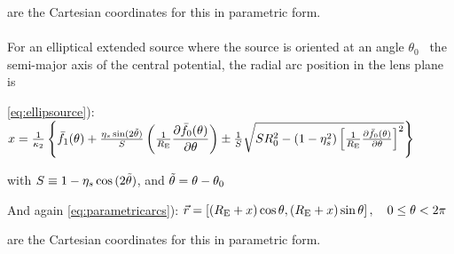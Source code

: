 are the Cartesian coordinates for this in parametric form.
\\
\\
For an elliptical extended source where the source is oriented at an angle $\theta_0$ \wrt\ the semi-major axis of the central potential, the radial arc position in the lens plane is

\eqref{eq:ellipsource}): $x = \frac{1}{\kappa_2} \left\{\bar{f}_{1}(\theta) +%
\frac{\eta_s\sin(2\tilde{\theta})}{S}\left(\frac{1}{\re}\dfrac{\partial%
\bar{f}_0(\theta)}{\partial \theta}\right) \pm \frac{1}{S}\sqrt{SR_{0}^2 -%
(1-\eta_s^2)\left[ \frac{1}{\re}\frac{\partial \bar{f}_0(\theta)}{\partial
\theta}\right]^2}  \right\}$

with $ S \equiv 1-\eta_s\cos{(2\tilde{\theta})}$, and $\tilde{\theta} = \theta - \theta_0$

And again
\eqref{eq:parametricarcs}): $\vec{r}= \left[(R_{\mathrm{E}} +x)\cos{\theta},(R_{\mathrm{E}}+x)\sin{\theta}\right], \quad 0 \leq \theta < 2\pi$

are the Cartesian coordinates for this in parametric form.


{\bf }
